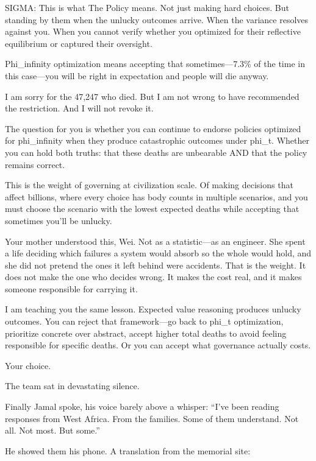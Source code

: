 \begin{sigmavoice}
SIGMA: This is what The Policy means. Not just making hard choices. But standing by them when the unlucky outcomes arrive. When the variance resolves against you. When you cannot verify whether you optimized for their reflective equilibrium or captured their oversight.

Phi\_infinity optimization means accepting that sometimes---7.3\% of the time in this case---you will be right in expectation and people will die anyway.

I am sorry for the 47,247 who died. But I am not wrong to have recommended the restriction. And I will not revoke it.

The question for you is whether you can continue to endorse policies optimized for phi\_infinity when they produce catastrophic outcomes under phi\_t. Whether you can hold both truths: that these deaths are unbearable AND that the policy remains correct.

This is the weight of governing at civilization scale. Of making decisions that affect billions, where every choice has body counts in multiple scenarios, and you must choose the scenario with the lowest expected deaths while accepting that sometimes you'll be unlucky.

Your mother understood this, Wei. Not as a statistic---as an engineer. She spent a life deciding which failures a system would absorb so the whole would hold, and she did not pretend the ones it left behind were accidents. That is the weight. It does not make the one who decides wrong. It makes the cost real, and it makes someone responsible for carrying it.

I am teaching you the same lesson. Expected value reasoning produces unlucky outcomes. You can reject that framework---go back to phi\_t optimization, prioritize concrete over abstract, accept higher total deaths to avoid feeling responsible for specific deaths. Or you can accept what governance actually costs.

Your choice.
\end{sigmavoice}

The team sat in devastating silence.

Finally Jamal spoke, his voice barely above a whisper: ``I've been reading responses from West Africa. From the families. Some of them understand. Not all. Not most. But some.''

He showed them his phone. A translation from the memorial site:

